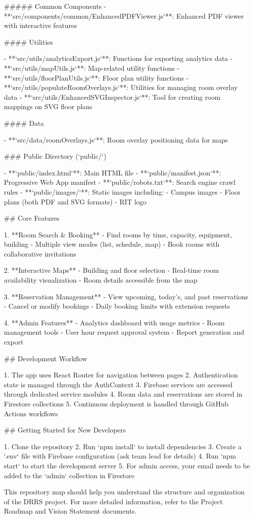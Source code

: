 ##### Common Components
- **`src/components/common/EnhancedPDFViewer.js`**: Enhanced PDF viewer with interactive features

#### Utilities

- **`src/utils/analyticsExport.js`**: Functions for exporting analytics data
- **`src/utils/mapUtils.js`**: Map-related utility functions
- **`src/utils/floorPlanUtils.js`**: Floor plan utility functions
- **`src/utils/populateRoomOverlays.js`**: Utilities for managing room overlay data
- **`src/utils/EnhancedSVGInspector.js`**: Tool for creating room mappings on SVG floor plans

#### Data

- **`src/data/roomOverlays.js`**: Room overlay positioning data for maps

### Public Directory (`public/`)

- **`public/index.html`**: Main HTML file
- **`public/manifest.json`**: Progressive Web App manifest
- **`public/robots.txt`**: Search engine crawl rules
- **`public/images/`**: Static images including:
  - Campus images
  - Floor plans (both PDF and SVG formats)
  - RIT logo

## Core Features

1. **Room Search & Booking**
   - Find rooms by time, capacity, equipment, building
   - Multiple view modes (list, schedule, map)
   - Book rooms with collaborative invitations

2. **Interactive Maps**
   - Building and floor selection
   - Real-time room availability visualization
   - Room details accessible from the map

3. **Reservation Management**
   - View upcoming, today's, and past reservations
   - Cancel or modify bookings
   - Daily booking limits with extension requests

4. **Admin Features**
   - Analytics dashboard with usage metrics
   - Room management tools
   - User hour request approval system
   - Report generation and export

## Development Workflow

1. The app uses React Router for navigation between pages
2. Authentication state is managed through the AuthContext
3. Firebase services are accessed through dedicated service modules
4. Room data and reservations are stored in Firestore collections
5. Continuous deployment is handled through GitHub Actions workflows

## Getting Started for New Developers

1. Clone the repository
2. Run `npm install` to install dependencies
3. Create a `.env` file with Firebase configuration (ask team lead for details)
4. Run `npm start` to start the development server
5. For admin access, your email needs to be added to the `admin` collection in Firestore

This repository map should help you understand the structure and organization of the DRRS project. For more detailed information, refer to the Project Roadmap and Vision Statement documents.
